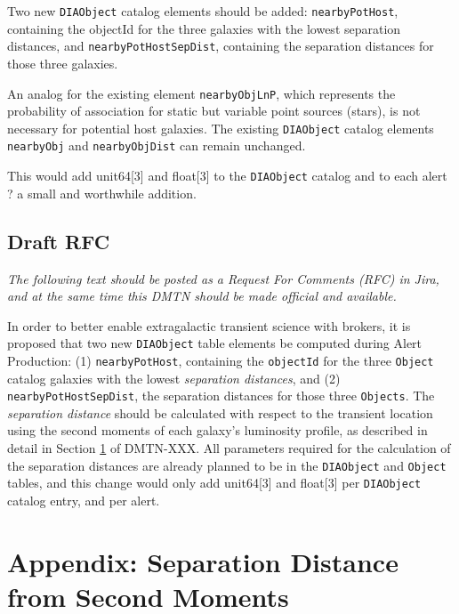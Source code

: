 \documentclass[DM,lsstdraft,authoryear,toc]{lsstdoc}
\begin{document}
Two new {\tt DIAObject} catalog elements should be added: {\tt nearbyPotHost}, containing the objectId for the three galaxies with the lowest separation distances, and {\tt nearbyPotHostSepDist}, containing the separation distances for those three galaxies.

An analog for the existing element {\tt nearbyObjLnP}, which represents the probability of association for static but variable point sources (stars), is not necessary for potential host galaxies. The existing {\tt DIAObject} catalog elements {\tt nearbyObj} and {\tt nearbyObjDist} can remain unchanged.

This would add unit64[3] and float[3] to the {\tt DIAObject} catalog and to each alert ? a small and worthwhile addition.


\subsection{Draft RFC}\label{ssec:draft_rfc}

\textit{The following text should be posted as a Request For Comments (RFC) in Jira, and at the same time this DMTN should be made official and available.}

In order to better enable extragalactic transient science with brokers, it is proposed that two new {\tt DIAObject} table elements be computed during Alert Production:
(1) {\tt nearbyPotHost}, containing the {\tt objectId} for the three {\tt Object} catalog galaxies with the lowest \emph{separation distances}, and
(2) {\tt nearbyPotHostSepDist}, the separation distances for those three {\tt Objects}.
The \emph{separation distance} should be calculated with respect to the transient location using the second moments of each galaxy's luminosity profile, as described in detail in Section \ref{sec:app} of DMTN-XXX.
All parameters required for the calculation of the separation distances are already planned to be in the {\tt DIAObject} and {\tt Object} tables, and this change would only add unit64[3] and float[3] per {\tt DIAObject} catalog entry, and per alert. 




\clearpage
\section{Appendix: Separation Distance from Second Moments}\label{sec:app}
\end{document}
